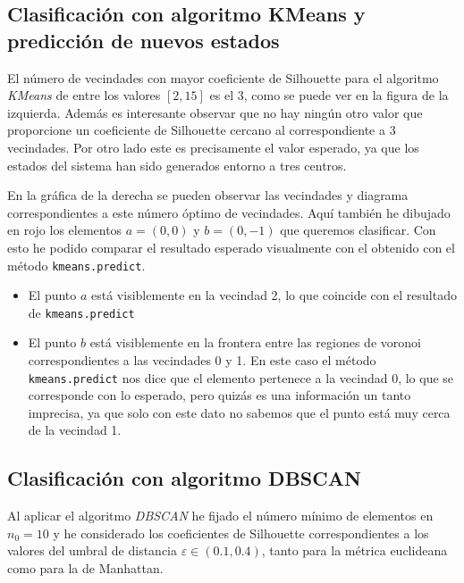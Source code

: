 \documentclass[10pt, spanish]{article}
\theoremstyle{definition}
\theoremstyle{break}
\begin{document}
\subsection{Clasificación con algoritmo KMeans y predicción de nuevos estados}

El número de vecindades con mayor coeficiente de Silhouette para el algoritmo
\textit{KMeans} de entre los valores $[2,15]$ es el 3, como se puede ver en la
figura de la izquierda. Además es interesante observar que no hay ningún otro
valor que proporcione un coeficiente de Silhouette cercano al correspondiente a
3 vecindades.  Por otro lado este es precisamente el valor esperado, ya que los
estados del sistema han sido generados entorno a tres centros.

En la gráfica de la derecha se pueden observar las vecindades y diagrama
correspondientes a este número óptimo de vecindades. Aquí también he dibujado en
rojo los elementos $a=(0,0)$ y $b=(0,-1)$ que queremos clasificar. Con esto he
podido comparar el resultado esperado visualmente con el obtenido con el método
\texttt{kmeans.predict}.
\begin{itemize}
\setlength\itemsep{0em}
    \item El punto $a$ está visiblemente en la vecindad 2, lo que coincide con
        el resultado de  \texttt{kmeans.predict} 
    \item El punto $b$ está visiblemente en la frontera entre las regiones de
voronoi correspondientes a las vecindades 0 y 1. En este caso el método
\texttt{kmeans.predict} nos dice que el elemento pertenece a la vecindad 0, lo
que se corresponde con lo esperado, pero quizás es una información un tanto
imprecisa, ya que solo con este dato no sabemos que el punto está muy cerca de
la vecindad 1.  \end{itemize}

\vspace{-1em}

\begin{center}
    \makebox[\textwidth][c]{\scalebox{0.65}{}}
\end{center}

\subsection{Clasificación con algoritmo DBSCAN}

Al aplicar el algoritmo \textit{DBSCAN} he fijado el número mínimo de elementos
en $n_0=10$ y he considerado los coeficientes de Silhouette correspondientes a
los valores del umbral de distancia $\varepsilon\in(0.1, 0.4)$, tanto para la
métrica euclideana como para la de Manhattan.
\end{document}

